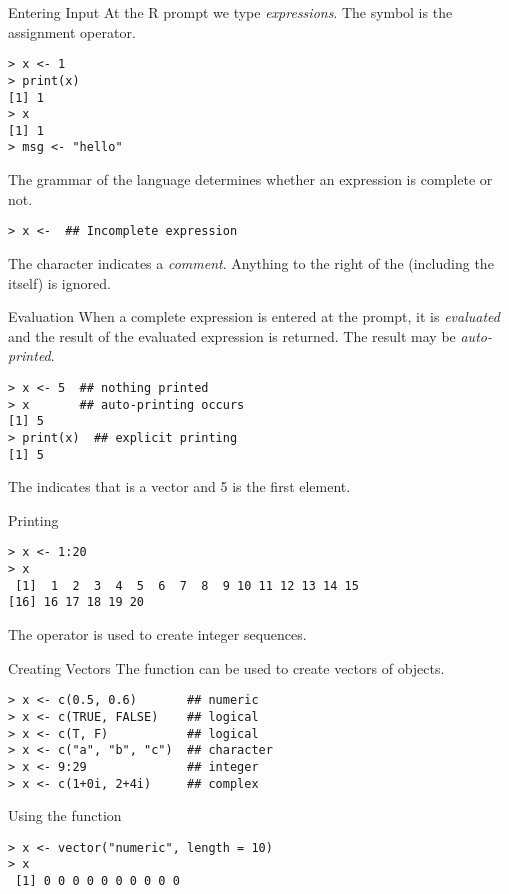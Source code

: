 \documentclass[aspectratio=169]{beamer}
\begin{document}
\begin{frame}[fragile]{Entering Input}
At the R prompt we type \textit{expressions}.  The \code{<-} symbol is
the assignment operator.
\begin{verbatim}
> x <- 1
> print(x)
[1] 1
> x
[1] 1
> msg <- "hello"
\end{verbatim}
The grammar of the language determines whether an expression is
complete or not.
\begin{verbatim}
> x <-  ## Incomplete expression
\end{verbatim}
The \code{\#} character indicates a \textit{comment}.  Anything to the
right of the \code{\#} (including the \code{\#} itself) is ignored.
\end{frame}

\begin{frame}[fragile]{Evaluation}
When a complete expression is entered at the prompt, it is
\textit{evaluated} and the result of the evaluated expression is
returned.  The result may be \textit{auto-printed}.
\begin{verbatim}
> x <- 5  ## nothing printed
> x       ## auto-printing occurs
[1] 5
> print(x)  ## explicit printing
[1] 5
\end{verbatim}
The \code{[1]} indicates that  is a vector and 5 is the first
element.
\end{frame}


\begin{frame}[fragile]{Printing}
\begin{verbatim}
> x <- 1:20
> x
 [1]  1  2  3  4  5  6  7  8  9 10 11 12 13 14 15
[16] 16 17 18 19 20
\end{verbatim}
The \code{:} operator is used to create integer sequences.
\end{frame}

\begin{frame}[fragile]{Creating Vectors}
The  function can be used to create vectors of objects.
\begin{verbatim}
> x <- c(0.5, 0.6)       ## numeric
> x <- c(TRUE, FALSE)    ## logical
> x <- c(T, F)           ## logical
> x <- c("a", "b", "c")  ## character
> x <- 9:29              ## integer
> x <- c(1+0i, 2+4i)     ## complex
\end{verbatim}
Using the  function
\begin{verbatim}
> x <- vector("numeric", length = 10)
> x
 [1] 0 0 0 0 0 0 0 0 0 0
\end{verbatim}
\end{frame}
\end{document}

